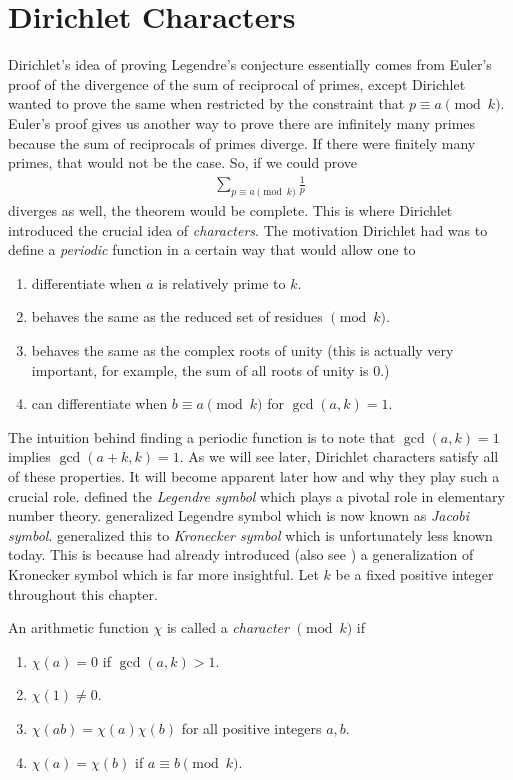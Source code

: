 \documentclass[elemannt.tex]{subfile}
\begin{document}
	\section{Dirichlet Characters}
	Dirichlet's idea of proving Legendre's conjecture essentially comes from Euler's proof of the divergence of the sum of reciprocal of primes, except Dirichlet wanted to prove the same when restricted by the constraint that $p\equiv a\pmod{k}$. Euler's proof gives us another way to prove there are infinitely many primes because the sum of reciprocals of primes diverge. If there were finitely many primes, that would not be the case. So, if we could prove
		\begin{align*}
			\sum_{p\equiv a\pmod{k}}\frac{1}{p}
		\end{align*}
	diverges as well, the theorem would be complete. This is where Dirichlet introduced the crucial idea of \textit{characters}. The motivation Dirichlet had was to define a \textit{periodic} function in a certain way that would allow one to
		\begin{enumerate}
			\item differentiate when $a$ is relatively prime to $k$.
			\item behaves the same as the reduced set of residues $\pmod{k}$.
			\item behaves the same as the complex roots of unity (this is actually very important, for example, the sum of all roots of unity is $0$.)
			\item can differentiate when $b\equiv a\pmod{k}$ for $\gcd(a,k)=1$.
		\end{enumerate}
	The intuition behind finding a periodic function is to note that $\gcd(a,k)=1$ implies $\gcd(a+k,k)=1$. As we will see later, Dirichlet characters satisfy all of these properties. It will become apparent later how and why they play such a crucial role. \textcite[pp. 186]{legendre_1798} defined the \textit{Legendre symbol} which plays a pivotal role in elementary number theory. \textcite{jacobi_1846} generalized Legendre symbol which is now known as \textit{Jacobi symbol}. \textcite[pp. 770]{kronecker_1885} generalized this to \textit{Kronecker symbol} which is unfortunately less known today. This is because \textcite{dirichlet_1837} had already introduced (also see \textcite{dirichlet_1897_21}) a generalization of Kronecker symbol which is far more insightful. Let $k$ be a fixed positive integer throughout this chapter.
		\begin{definition}
			An arithmetic function $\chi$ is called a \textit{character} $\pmod{k}$ if
				\begin{enumerate}
					\item $\chi(a)=0$ if $\gcd(a,k)>1$.
					\item $\chi(1)\neq0$.
					\item $\chi(ab)=\chi(a)\chi(b)$ for all positive integers $a,b$.
					\item $\chi(a)=\chi(b)$ if $a\equiv b\pmod{k}$.
				\end{enumerate}
		\end{definition}
\end{document}
